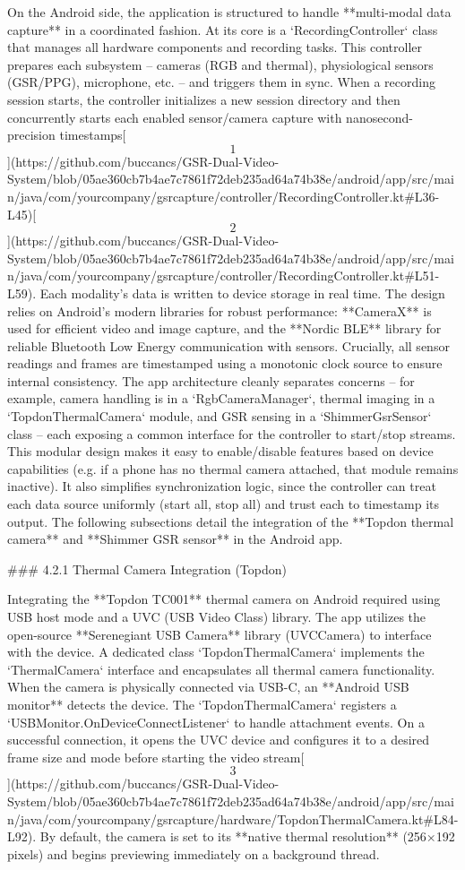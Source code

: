 \documentclass[12pt,a4paper]{article}
\begin{document}
{On the Android side, the application is structured to handle
**multi-modal data capture** in a coordinated fashion. At its core is a
`RecordingController` class that manages all hardware components and
recording tasks. This controller prepares each subsystem -- cameras (RGB
and thermal), physiological sensors (GSR/PPG), microphone, etc. -- and
triggers them in sync. When a recording session starts, the controller
initializes a new session directory and then concurrently starts each
enabled sensor/camera capture with nanosecond-precision
timestamps[\[1\]](https://github.com/buccancs/GSR-Dual-Video-System/blob/05ae360cb7b4ae7c7861f72deb235ad64a74b38e/android/app/src/main/java/com/yourcompany/gsrcapture/controller/RecordingController.kt#L36-L45)[\[2\]](https://github.com/buccancs/GSR-Dual-Video-System/blob/05ae360cb7b4ae7c7861f72deb235ad64a74b38e/android/app/src/main/java/com/yourcompany/gsrcapture/controller/RecordingController.kt#L51-L59).
Each modality's data is written to device storage in real time. The
design relies on Android's modern libraries for robust performance:
**CameraX** is used for efficient video and image capture, and the
**Nordic BLE** library for reliable Bluetooth Low Energy communication
with sensors. Crucially, all sensor readings and frames are timestamped
using a monotonic clock source to ensure internal consistency. The app
architecture cleanly separates concerns -- for example, camera handling
is in a `RgbCameraManager`, thermal imaging in a `TopdonThermalCamera`
module, and GSR sensing in a `ShimmerGsrSensor` class -- each exposing a
common interface for the controller to start/stop streams. This modular
design makes it easy to enable/disable features based on device
capabilities (e.g. if a phone has no thermal camera attached, that
module remains inactive). It also simplifies synchronization logic,
since the controller can treat each data source uniformly (start all,
stop all) and trust each to timestamp its output. The following
subsections detail the integration of the **Topdon thermal camera** and
**Shimmer GSR sensor** in the Android app.

### 4.2.1 Thermal Camera Integration (Topdon)

Integrating the **Topdon TC001** thermal camera on Android required
using USB host mode and a UVC (USB Video Class) library. The app
utilizes the open-source **Serenegiant USB Camera** library (UVCCamera)
to interface with the device. A dedicated class `TopdonThermalCamera`
implements the `ThermalCamera` interface and encapsulates all thermal
camera functionality. When the camera is physically connected via USB-C,
an **Android USB monitor** detects the device. The `TopdonThermalCamera`
registers a `USBMonitor.OnDeviceConnectListener` to handle attachment
events. On a successful connection, it opens the UVC device and
configures it to a desired frame size and mode before starting the video
stream[\[3\]](https://github.com/buccancs/GSR-Dual-Video-System/blob/05ae360cb7b4ae7c7861f72deb235ad64a74b38e/android/app/src/main/java/com/yourcompany/gsrcapture/hardware/TopdonThermalCamera.kt#L84-L92).
By default, the camera is set to its **native thermal resolution**
(256×192 pixels) and begins previewing immediately on a background
thread.

}
\end{document}
